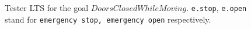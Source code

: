\begin{figure}[H]
\centering
{}
\caption{Tester LTS for the goal $DoorsClosedWhileMoving$\label{Fig:Goals:Injection}. {\small \texttt{e.stop}, \texttt{e.open} stand for \texttt{emergency stop, emergency open} respectively}.}
\end{figure}

